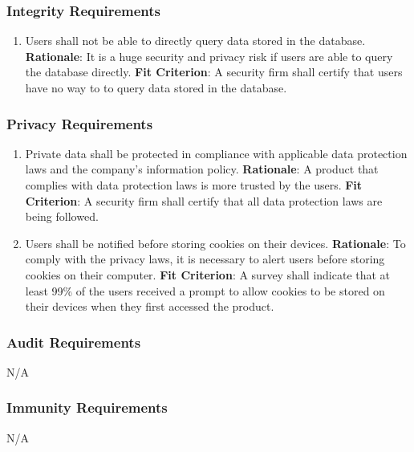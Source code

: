 \documentclass[12pt]{article}
\begin{document}
\subsubsection{Integrity Requirements}
\begin{enumerate}[nfr]
    \item Users shall not be able to directly query data stored in the database.
    \newline \textbf{Rationale}: It is a huge security and privacy risk if users are able to query the database directly.
    \newline \textbf{Fit Criterion}: A security firm shall certify that users have no way to to query data stored in the database.
\end{enumerate}

\subsubsection{Privacy Requirements}
\begin{enumerate}[nfr]
    \item Private data shall be protected in compliance with applicable data protection laws and the company's information policy.
    \newline \textbf{Rationale}: A product that complies with data protection laws is more trusted by the users.
    \newline \textbf{Fit Criterion}: A security firm shall certify that all data protection laws are being followed.
    
    \item Users shall be notified before storing cookies on their devices.
    \newline \textbf{Rationale}: To comply with the privacy laws, it is necessary to alert users before storing cookies on their computer.
    \newline \textbf{Fit Criterion}: A survey shall indicate that at least 99\% of the users received a prompt to allow cookies to be stored on their devices when they first accessed the product.
\end{enumerate}

\subsubsection{Audit Requirements}
N/A

\subsubsection{Immunity Requirements}
N/A
\end{document}

